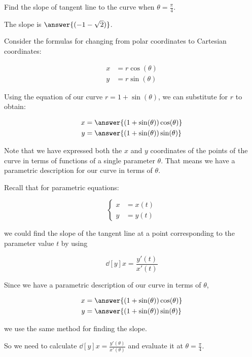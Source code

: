 \documentclass{ximera}
\begin{document}
\begin{exercise}
\begin{hint}
\end{hint}

\begin{exercise}

Find the slope of tangent line to the curve when $\theta=\frac{\pi}{4}$. 

The slope is $\answer{ ( -1-\sqrt{2} )  }$.

\begin{hint}

Consider the formulas for changing from polar coordinates to Cartesian coordinates:

\begin{align*}
x&=r\cos(\theta) \\
y&=r\sin(\theta)
\end{align*}

Using the equation of our curve $r=1+\sin(\theta)$, we can substitute for $r$ to obtain:

\begin{align*}
x&=\answer{(1+\sin(\theta))\cos(\theta)} \\
y&=\answer{(1+\sin(\theta))\sin(\theta) }
\end{align*}

Note that we have expressed both the $x$ and $y$ coordinates of the points of the curve in terms of functions of a single parameter $\theta$. That means we have a parametric description for our curve in terms of $\theta$. 

Recall that for parametric equations: 

\[ \begin{cases}
x&=x(t) \\
y&=y(t)
\end{cases} \]

we could find the slope of the tangent line at a point corresponding to the parameter value $t$ by using 

\[\dd[y]{x}=\frac{ y'(t)}{x'(t)}\]


Since we have a parametric description of our curve in terms of $\theta$, 

\begin{align*}
x&=\answer{(1+\sin(\theta))\cos(\theta)} \\
y&=\answer{(1+\sin(\theta))\sin(\theta) }
\end{align*}

we use the same method for finding the slope. 

So we need to calculate $\dd[y]{x}=\frac{ y'(\theta)}{x'(\theta)}$ and evaluate it at $\theta=\frac{\pi}{4}$. 


\end{hint}
\end{exercise}
\end{exercise}
\end{document}
